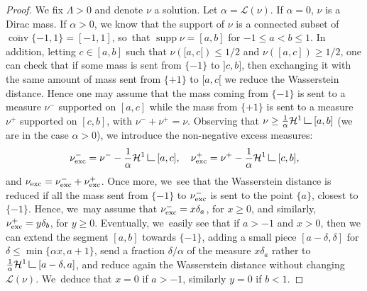 \documentclass[JEP,XML,SOM,Unicode,NoFloatCountersInSection,published]{cedram}
\theoremstyle{definition}
\newcommand\LM[1]{\hbox{\vrule width.5pt \vbox to#1pt{\vfill \hrule width#1pt height.5pt}}}
\newcommand\LL{{\mathchoice {\>\LM7\>}{\>\LM7\>}{\,\LM5\,}{\,\LM{3.35}\,}}}
\newcommand{\mres}{\LL}
\newcommand\cH{\mathcal{H}}
\newcommand\cL{\mathcal{L}}
\DeclareMathOperator{\supp}{supp}
\DeclareMathOperator{\conv}{conv}
\newcommand{\cconv}{\overline{\conv}}
\newcommand{\nuexc}{\nu_{\textup{exc}}}
\newcommand{\ci}[2]{ \left[ #1, #2 \right] }
\begin{document}
\begin{proof}
We fix $\Lambda>0$ and denote $\nu$ a solution.
Let $\alpha=\mathcal{L}(\nu)$.
If $\alpha=0$, $\nu$ is a Dirac mass. If $\alpha>0$,
we know that the support of $\nu$ is a connected subset of
$\cconv{\{-1,1\}}=[-1,1]$, so~that $\supp\nu = [a,b]$ for $-1\le a < b\le 1$.
In addition, letting $c\in [a,b]$ such that
$\nu([a,c[)\le 1/2$ and $\nu([a,c])\ge 1/2$, one can check that
if some mass is sent from $\{-1\}$ to $]c,b]$, then exchanging it
with the same amount of mass sent from $\{+1\}$ to $[a,c[$ we reduce
the Wasserstein distance. Hence one may assume that the mass
coming from $\{-1\}$ is sent to a measure $\nu^-$ supported on $[a,c]$
while the mass from $\{+1\}$ is sent to a measure $\nu^+$ supported
on $[c,b]$, with $\nu^-+\nu^+=\nu$. Observing that $\nu\ge \frac{1}{\alpha}\cH^1\mres [a,b]$
(we are in the case $\alpha>0$),
we introduce the non-negative excess measures:
\[
\nuexc^- = \nu^- - \frac{1}{\alpha}\cH^1\mres [a,c],\quad
\nuexc^+ = \nu^+ - \frac{1}{\alpha}\cH^1\mres [c,b],
\]
and $\nuexc = \nuexc^-+\nuexc^+$. Once more, we~see that the Wasserstein
distance is reduced if all the mass sent from $\{-1\}$ to $\nuexc^-$
is sent to the point $\{a\}$, closest to $\{-1\}$. Hence, we~may assume
that $\nuexc^-= x\delta_a$, for $x\ge 0$, and similarly,
$\nuexc^+ = y\delta_b$, for $y\ge 0$. Eventually, we~easily see that
if $a>-1$ and $x>0$, then we can extend the segment $[a,b]$ towards $\{-1\}$,
adding a small piece $[a-\delta,\delta]$ for $\delta\le
\min \{\alpha x, a+1\}$, send a fraction $\delta/\alpha$ of
the measure $x\delta_{a}$ rather to $\frac{1}{\alpha}\cH^1\mres [a-\delta,a]$,
and reduce again the Wasserstein distance without changing $\mathcal{L}(\nu)$. We~deduce that $x=0$ if $a>-1$, similarly $y=0$ if $b<1$.

\newcommand{\noop}[1]{}
\noop{
Since the solutions are supported on a line segment in $\ci{-1}{1}$, they are of the form $\nu=\delta_{a}$ or
$ \nu = \frac{1}{\alpha}\cH^1\mres\ci{a}{b}+\nuexc$,
with $\alpha=\cL(\nu)$ and $\supp \nuexc \subset \ci{a}{b}\subset \ci{-1}{1}$.

Since solutions are supported on a line segment in $\ci{-1}{1}$, we~use the ansatz and assume them to be of the form
\[
\nu = \frac{1}{\alpha}\cH^1\mres\ci{a}{b}
\text{ or }
\nu = \frac{1}{\alpha}\cH^1\mres\ci{-1}{1} + c\delta_{-1} +d\delta_1.
\]
Indeed if the $[a,b]$ does not coincide with $[-1,1]$ and there is any mass left after we form the uniform measure over the segment $[a,b]$, we~enlarge a bit the segment. If $a$ or $b$ coincide with $-1,1$, we~can just leave any residual mass concentrated at the Dirac delta with no transportation cost, see for instance Lemma~\ref{lemma.minimal_distance2Sigma} below.}


\end{proof}
\end{document}
